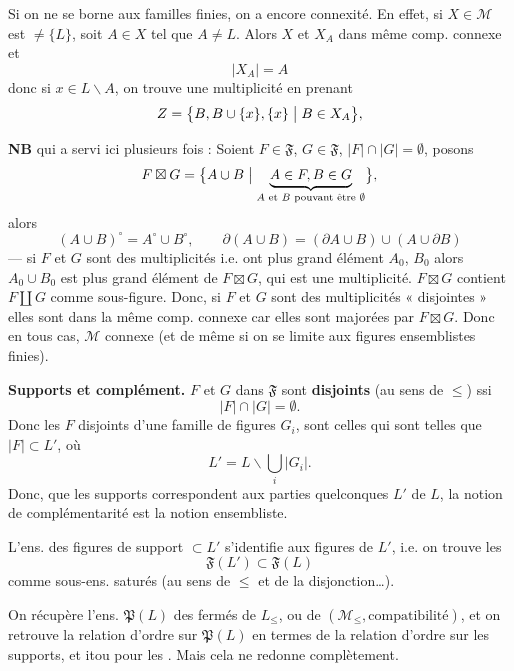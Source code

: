\documentclass[11pt,a4paper]{article}
\begin{document}
Si on ne se borne aux familles finies, on a encore connexité. En effet, si $X \in \mathcal{M}$ est $\neq \{L\}$, soit $A \in X$ tel que $A \neq L$. Alors $X$ et $X_A$ dans même comp. connexe et
\[
  |X_A| = A
\]
donc si \struck{\ill{}} $x \in L \smallsetminus A$, on trouve une multiplicité en prenant
\[
  Z = \bigl\{ B, B \cup \{x\}, \{x\} \bigm| B \in X_A \bigr\} ,
\]

\textbf{NB}  qui a servi ici plusieurs fois : Soient $F \in \mathfrak{F}$, $G \in \mathfrak{F}$, $|F| \cap |G| = \emptyset$, posons
\[
  F \boxtimes G = \bigl\{ A \cup B \bigm| \underbrace{A \in F, B \in G}_{A \text{ et } B \text{ pouvant être } \emptyset} \bigr\} ,
\]
alors
\[
  (A \cup B)^{\circ} = A^{\circ} \cup B^{\circ} , \qquad \partial(A \cup B) = (\partial A \cup B) \cup (A \cup \partial B)
\]
— si $F$ et $G$ sont des multiplicités i.e.  ont plus grand élément $A_0$, $B_0$ alors $A_0 \cup B_0$ est plus grand élément de $F \boxtimes G$, qui est une multiplicité.  $F \boxtimes G$ contient $F \amalg G$ comme sous-figure. Donc, si $F$ et $G$ sont des multiplicités « disjointes » elles sont dans la même comp. connexe car elles sont majorées par $F \boxtimes G$. Donc en tous cas, $\mathcal{M}$ connexe (et de même si on se limite aux  figures ensemblistes finies).

\textbf{Supports et complément.} $F$ et $G$ dans $\mathfrak{F}$ sont \textbf{disjoints} (au sens de $\leq$) ssi
\[
  |F| \cap |G| = \emptyset .
\]
Donc les $F$ disjoints d'une famille de figures $G_i$, sont celles qui sont  telles que $|F| \subset L'$, où
\[
  L' = L \smallsetminus \bigcup_i |G_i| .
\]
Donc,  que les supports correspondent aux parties quelconques $L'$ de $L$, la notion de complémentarité est la notion ensembliste.

 L'ens. des figures de support $\subset L'$   s'identifie aux figures de $L'$, i.e. on trouve les
\[
  \mathfrak{F}(L') \subset \mathfrak{F}(L)
\]
comme sous-ens. saturés (au sens de $\leq$ et de la disjonction…).

On récupère l'ens. $\mathfrak{P}(L)$ des fermés de $L_{\leq}$, ou de $(\mathcal{M}_{\leq}, \text{compatibilité})$, et on retrouve la relation d'ordre sur $\mathfrak{P}(L)$ en termes de la relation d'ordre sur les supports, et itou pour les . Mais cela ne redonne \struck{\ill{}} complètement.
\end{document}
